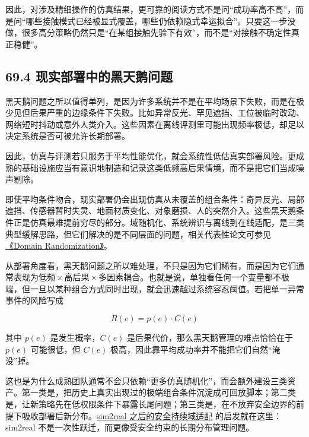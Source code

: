 因此，对涉及精细操作的仿真结果，更可靠的阅读方式不是问“成功率高不高”，而是问“哪些接触模式已经被显式覆盖，哪些仍依赖隐式幸运拟合”。只要这一步没做，很多高分策略仍然只是“在某组接触先验下有效”，而不是“对接触不确定性真正稳健”。

\subsection*{69.4 现实部署中的黑天鹅问题}


黑天鹅问题之所以值得单列，是因为许多系统并不是在平均场景下失败，而是在极少见但后果严重的边缘条件下失败。比如异常反光、罕见遮挡、工位被临时改动、网络短时抖动或意外人类介入。这些因素在离线评测里可能出现频率极低，却足以决定系统是否可被允许长期部署。

因此，仿真与评测若只服务于平均性能优化，就会系统性低估真实部署风险。更成熟的基础设施应当有意识地制造和记录这类低频高后果情境，而不是把它们当成噪声剔除。

即使平均条件吻合，现实部署仍会出现仿真从未覆盖的组合条件：奇异反光、局部遮挡、传感器暂时失灵、地面材质变化、对象磨损、人的突然介入。这些黑天鹅条件正是仿真最难提前穷尽的部分。域随机化、系统辨识与离线到在线适配，是三类典型缓解思路，但它们解决的是不同层面的问题，相关代表性论文可参见 \href{https://arxiv.org/abs/1703.06907}{《Domain Randomization》}。

从部署角度看，黑天鹅问题之所以难处理，不只是因为它们稀有，而是因为它们通常表现为\(低频 \times  高后果 \times  多因素耦合\)。也就是说，单独看任何一个变量都不极端，但一旦以某种组合方式同时出现，就会迅速越过系统容忍阈值。若把单一异常事件的风险写成

\begin{equation*}
R(e) = p(e) \cdot C(e)
\end{equation*}

其中 \(p(e)\) 是发生概率，\(C(e)\) 是后果代价，那么黑天鹅管理的难点恰恰在于 \(p(e)\) 可能很低，但 \(C(e)\) 极高，因此靠平均成功率并不能把它们自然“淹没”掉。

这也是为什么成熟团队通常不会只依赖“更多仿真随机化”，而会额外建设三类资产。第一类是\texttt{}，把历史上真实出现过的极端组合条件沉淀成可回放脚本；第二类是\texttt{}，让新策略先在低权限条件下暴露长尾问题；第三类是\texttt{}，在不放弃安全边界的前提下吸收部署后新分布。\href{https://arxiv.org/abs/2503.10949}{sim2real 之后的安全持续域适配} 的启发就在这里：sim2real 不是一次性跃迁，而更像受安全约束的长期分布管理问题。

